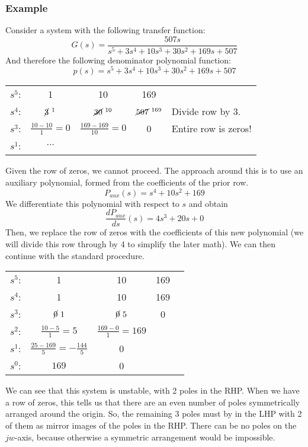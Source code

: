 \documentclass{book}
\newcommand{\exmp}{\subsubsection*{Example}}
\begin{document}
\exmp
Consider a system with the following transfer function:
\[ G(s) = \frac{507s}{s^5 + 3s^4 + 10s^3 + 30s^2 + 169s + 507} \]
And therefore the following denominator polynomial function:
\[ p(s) = s^5 + 3s^4 + 10s^3 + 30s^2 + 169s + 507 \]
\begin{center}
	\begin{tabular}{c c c c l}\vspace{1em}
		$ s^5 $: &  1 & 10 & 169 & \\ \vspace{1em}
		$ s^4 $: & $ \cancel{3}^{\ 1} $ & $ \cancel{30}^{\ 10} $ & $ \cancel{507}^{\ 169} $ & Divide row by 3. \\ \vspace{1em}
		$ s^3 $: & $ \frac{10-10}{1}=0 $ & $ \frac{169-169}{10}=0 $ & 0 &  Entire row is zeros! \\ \vspace{1em}
		$ s^1 $: & $ \cdots $ & & &
	\end{tabular}
\end{center}
Given the row of zeros, we cannot proceed. The approach around this is to use an auxiliary polynomial, formed from the coefficients of the prior row.
\[ P_{aux}(s) = s^4 + 10s^2 + 169 \]
We differentiate this polynomial with respect to $ s $ and obtain
\[ \frac{dP_{aux}}{ds}(s) = 4s^3 + 20s + 0 \]
Then, we replace the row of zeros with the coefficients of this new polynomial (we will divide this row through by 4 to simplify the later math). We can then continue with the standard procedure.
\begin{center}
	\begin{tabular}{c c c c l}\vspace{1em}
		$ s^5 $: &  1 & 10 & 169 & \\ \vspace{1em}
		$ s^4 $: & 1 & 10 & 169 & \\ \vspace{1em}
		$ s^3 $: & $ \cancel{0}\ 1 $ & $ \cancel{0}\ 5 $ & 0 & \\ \vspace{1em}
		$ s^2 $: & $ \frac{10-5}{1}=5 $ & $ \frac{169-0}{1}=169 $ & & \\ \vspace{1em}
		$ s^1 $: & $ \frac{25-169}{5}=-\frac{144}{5} $ & 0 & & \\ \vspace{1em}
		$ s^0 $: & $ 169 $ & 0 & &
	\end{tabular}
\end{center}
We can see that this system is unstable, with 2 poles in the RHP. When we have a row of zeros, this tells us that there are an even number of poles symmetrically arranged around the origin. So, the remaining 3 poles must by in the LHP with 2 of them as mirror images of the poles in the RHP. There can be no poles on the $ jw $-axis, because otherwise a symmetric arrangement would be impossible.
\end{document}
